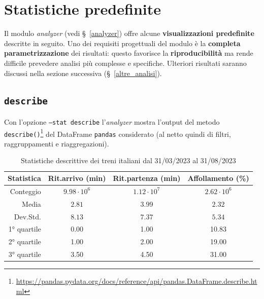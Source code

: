 \documentclass[12pt,a4paper,italian]{report}
\begin{document}
\section{Statistiche predefinite}

Il modulo \textit{analyzer} (vedi \S~\ref{analyzer}) offre alcune
\textbf{visualizzazioni predefinite} descritte in seguito.  Uno dei
requisiti progettuali del modulo è la \textbf{completa
    parametrizzazione} dei risultati: questo favorisce la
\textbf{riproducibilità} ma rende difficile prevedere analisi più
complesse e specifiche.  Ulteriori risultati saranno discussi nella
sezione successiva (\S~\ref{altre_analisi}).

\subsection{\texttt{describe}}
\label{stat_describe}

Con l'opzione \texttt{--stat describe} l'\textit{analyzer} mostra
l'output del metodo
\texttt{describe()}\footnote{\href{https://pandas.pydata.org/docs/reference/api/pandas.DataFrame.describe.html}{https://pandas.pydata.org/docs/reference/api/pandas.DataFrame.describe.html}}
del DataFrame \texttt{pandas} considerato (al netto quindi di filtri,
raggruppamenti e riaggregazioni).


\begin{table}[h]
    \begin{tabular}{r|ccc}
      \textbf{Statistica} & \textbf{Rit.\@ arrivo} (min) & \textbf{Rit.\@ partenza} (min) & \textbf{Affollamento} (\%)
      \\ \hline Conteggio & $9.98 \cdot 10^6$ & $1.12 \cdot 10^7$  & $2.62 \cdot 10^6$
      \\ Media & $2.81$ & $3.99$ & $2.32$
      \\ Dev.\@ Std.\@ & $8.13$ & $7.37$ & $5.34$
      \\ 1° quartile & 0.00 & 1.00 & 10.83
      \\ 2° quartile & 1.00 & 2.00 & 19.00
      \\ 3° quartile & 3.50 & 4.50 & 31.00 
    \end{tabular}
    \caption{Statistiche descrittive dei treni italiani dal 31/03/2023
        al 31/08/2023}
    \label{table:describe}
\end{table}
\end{document}
